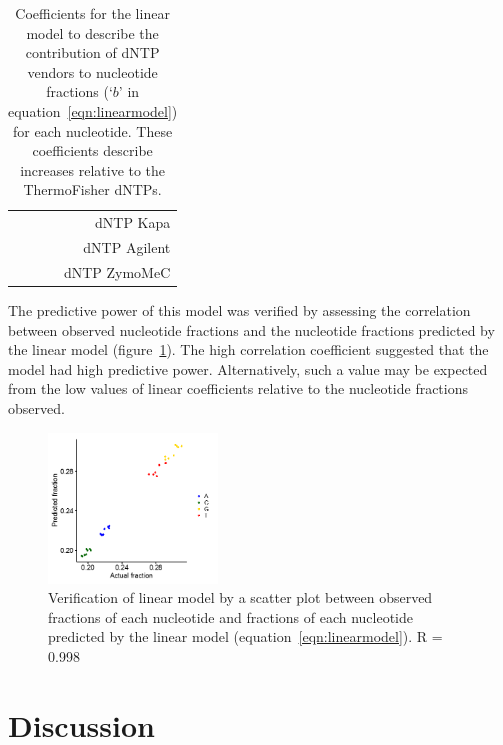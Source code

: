 \documentclass[a4paper, numbers=noenddot]{scrbook}
\begin{document}
\begin{table}[h]
  \centering
  \begin{tabular}{r}
    \toprule
    \\
    \midrule
    dNTP Kapa\\
    dNTP Agilent\\
    dNTP ZymoMeC\\
    \bottomrule
  \end{tabular}%
  \caption{Coefficients for the linear model to describe the contribution of dNTP vendors to nucleotide fractions (`$b$' in equation~\ref{eqn:linearmodel}) for each nucleotide.  These coefficients describe increases relative to the ThermoFisher dNTPs.}
  \label{tab:linearmodel_coeffs_b}
\end{table}

The predictive power of this model was verified by assessing the correlation between observed nucleotide fractions and the nucleotide fractions predicted by the linear model (figure~\ref{fig:linearmodel_ver}).  The high correlation coefficient suggested that the model had high predictive power.  Alternatively, such a value may be expected from the low values of linear coefficients relative to the nucleotide fractions observed.

\begin{figure}[htbp]
  \centering
  \includegraphics[width=0.4\textwidth]{linearmodel_plot}
  \caption{Verification of linear model by a scatter plot between observed fractions of each nucleotide and fractions of each nucleotide predicted by the linear model (equation~\ref{eqn:linearmodel}).  R = 0.998}
  \label{fig:linearmodel_ver}
\end{figure}

\section{Discussion}
\label{sec:pcrbias_discussion}
\end{document}
